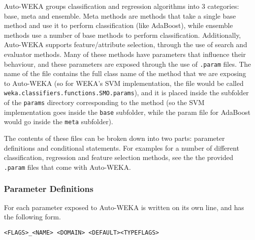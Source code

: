 Auto-WEKA groups classification and regression algorithms into 3 categories: base, meta and ensemble. Meta methods are methods that take a single base method and use it to perform classification (like AdaBoost), while ensemble methods use a number of base methods to perform classification. Additionally, Auto-WEKA supports feature/attribute selection, through the use of search and evaluator methods. Many of these methods have parameters that influence their behaviour, and these parameters are exposed through the use of \texttt{.param} files. The name of the file contains the full class name of the method that we are exposing to Auto-WEKA (so for WEKA's SVM implementation, the file would be called \texttt{weka.classifiers.functions.SMO.params}), and it is placed inside the subfolder of the \texttt{params} directory corresponding to the method (so the SVM implementation goes inside the \texttt{base} subfolder, while the param file for AdaBoost would go inside the \texttt{meta} subfolder).

The contents of these files can be broken down into two parts: parameter definitions and conditional statements. For examples for a number of different classification, regression and feature selection methods, see the the provided \texttt{.param} files that come with Auto-WEKA.

\subsubsection{Parameter Definitions}

For each parameter exposed to Auto-WEKA is written on its own line, and has the following form. 
\begin{center}
 \texttt{<FLAGS>\_<NAME> <DOMAIN> <DEFAULT><TYPEFLAGS>}
\end{center}

